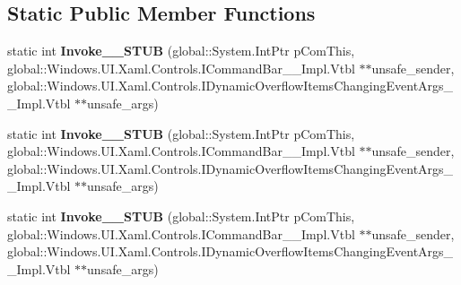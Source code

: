 \subsection*{Static Public Member Functions}
\begin{DoxyCompactItemize}
\item 
\mbox{\label{struct_windows_1_1_foundation_1_1_typed_event_handler___a___windows___u_i___xaml___controls___co63bd2e5cd00e6ef40624678b07024809_a8a81628682d0a0ebfec7ca21cde8d724}} 
static int {\bfseries Invoke\+\_\+\+\_\+\+S\+T\+UB} (global\+::\+System.\+Int\+Ptr p\+Com\+This, global\+::\+Windows.\+U\+I.\+Xaml.\+Controls.\+I\+Command\+Bar\+\_\+\+\_\+\+Impl.\+Vtbl $\ast$$\ast$unsafe\+\_\+sender, global\+::\+Windows.\+U\+I.\+Xaml.\+Controls.\+I\+Dynamic\+Overflow\+Items\+Changing\+Event\+Args\+\_\+\+\_\+\+Impl.\+Vtbl $\ast$$\ast$unsafe\+\_\+args)
\item 
\mbox{\label{struct_windows_1_1_foundation_1_1_typed_event_handler___a___windows___u_i___xaml___controls___co63bd2e5cd00e6ef40624678b07024809_a8a81628682d0a0ebfec7ca21cde8d724}} 
static int {\bfseries Invoke\+\_\+\+\_\+\+S\+T\+UB} (global\+::\+System.\+Int\+Ptr p\+Com\+This, global\+::\+Windows.\+U\+I.\+Xaml.\+Controls.\+I\+Command\+Bar\+\_\+\+\_\+\+Impl.\+Vtbl $\ast$$\ast$unsafe\+\_\+sender, global\+::\+Windows.\+U\+I.\+Xaml.\+Controls.\+I\+Dynamic\+Overflow\+Items\+Changing\+Event\+Args\+\_\+\+\_\+\+Impl.\+Vtbl $\ast$$\ast$unsafe\+\_\+args)
\item 
\mbox{\label{struct_windows_1_1_foundation_1_1_typed_event_handler___a___windows___u_i___xaml___controls___co63bd2e5cd00e6ef40624678b07024809_a8a81628682d0a0ebfec7ca21cde8d724}} 
static int {\bfseries Invoke\+\_\+\+\_\+\+S\+T\+UB} (global\+::\+System.\+Int\+Ptr p\+Com\+This, global\+::\+Windows.\+U\+I.\+Xaml.\+Controls.\+I\+Command\+Bar\+\_\+\+\_\+\+Impl.\+Vtbl $\ast$$\ast$unsafe\+\_\+sender, global\+::\+Windows.\+U\+I.\+Xaml.\+Controls.\+I\+Dynamic\+Overflow\+Items\+Changing\+Event\+Args\+\_\+\+\_\+\+Impl.\+Vtbl $\ast$$\ast$unsafe\+\_\+args)
\item 

\end{DoxyCompactItemize}
